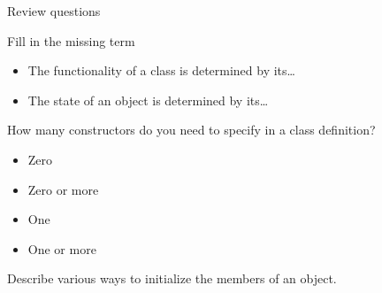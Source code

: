  {Review questions}

\begin{review}
  \label{ex:class-review1}
  Fill in the missing term
  \begin{itemize}
  \item The functionality of a class is determined by its\ldots
  \item The state of an object is determined by its\ldots
  \end{itemize}

  How many constructors do you need to specify in a class definition?
  \begin{itemize}
  \item Zero
  \item Zero or more
  \item One
  \item One or more
  \end{itemize}
\end{review}

\begin{review}
  \label{ex:class-review2}
  Describe various ways to initialize the members of an object.
\end{review}

\ifIncludeAnswers
\else
\endinput
\fi

\Level 0 {Homework discussions}

\Level 1 {Square inheritance}
\label{sec:discuss-square}

\begin{multicols}{2}
  \scriptsize
  \lstset{basicstyle=\scriptsize}
  
  \lstset{basicstyle=footnotesize}
\end{multicols}

\Level 1 {Goldbach conjecture}
\label{sec:discuss-goldbach}

\begin{multicols}{2}
  \scriptsize
  \lstset{basicstyle=\scriptsize}
  
  \lstset{basicstyle=footnotesize}
\end{multicols}

